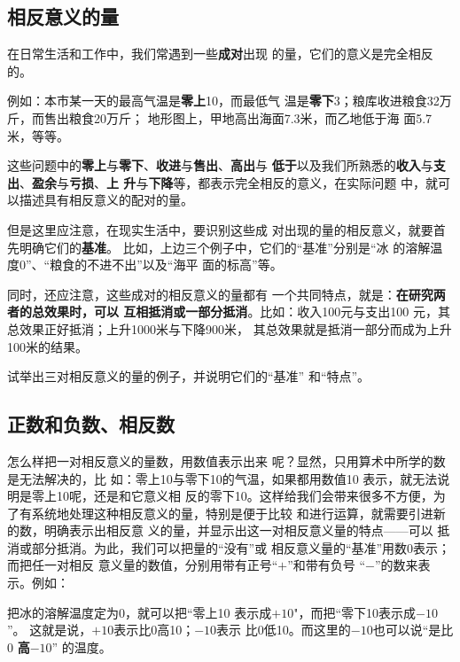 \subsection{相反意义的量}

在日常生活和工作中，我们常遇到一些\textbf{成对}出现
的量，它们的意义是完全相反的。

例如：本市某一天的最高气温是\textbf{零上}10\oc，而最低气
温是\textbf{零下}3\oc；粮库收进粮食32万斤，而售出粮食20万斤；
地形图上，甲地高出海面7.3米，而乙地低于海
面5.7米，等等。

    这些问题中的\textbf{零上}与\textbf{零下}、\textbf{收进}与\textbf{售出}、\textbf{高出}与
    \textbf{低于}以及我们所熟悉的\textbf{收入}与\textbf{支出}、\textbf{盈余}与\textbf{亏损}、\textbf{上
升}与\textbf{下降}等，都表示完全相反的意义，在实际问题
中，就可以描述具有相反意义的配对的量。

但是这里应注意，在现实生活中，要识别这些成
对出现的量的相反意义，就要首先明确它们的\textbf{基准}。
比如，上边三个例子中，它们的“基准”分别是“冰
的溶解温度0\oc”、“粮食的不进不出”以及“海平
面的标高”等。

    同时，还应注意，这些成对的相反意义的量都有
一个共同特点，就是：\textbf{在研究两者的总效果时，可以
互相抵消或一部分抵消}。比如：收入100元与支出100
元，其总效果正好抵消；上升1000米与下降900米，
其总效果就是抵消一部分而成为上升100米的结果。

\begin{ex}
    试举出三对相反意义的量的例子，并说明它们的“基准”
    和“特点”。
\end{ex}

\subsection{正数和负数、相反数}
    怎么样把一对相反意义的量数，用数值表示出来
呢？显然，只用算术中所学的数是无法解决的，比
如：零上10\oc 与零下10\oc 的气温，如果都用数值10
表示，就无法说明是零上10\oc 呢，还是和它意义相
反的零下10\oc。这样给我们会带来很多不方便，为
了有系统地处理这种相反意义的量，特别是便于比较
和进行运算，就需要引进新的数，明确表示出相反意
义的量，并显示出这一对相反意义量的特点——可以
抵消或部分抵消。为此，我们可以把量的“没有”或
相反意义量的“基准”用数0表示；而把任一对相反
意义量的数值，分别用带有正号“$+$”和带有负号
  “$-$”的数来表示。例如：
    
    把冰的溶解温度定为0\oc，就可以把“零上10\oc
表示成$+10$\oc"，而把“零下10\oc 表示成$-10$\oc”。
这就是说，$+ 10$\oc 表示比0\oc 高10\oc；$-10$\oc 表示
比0\oc 低10\oc 。而这里的$-10$\oc 也可以说“是比0\oc
\textbf{高}$-10$\oc” 的温度。


